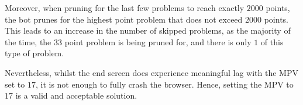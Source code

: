 \documentclass{article}
\begin{document}
Moreover, when pruning for the last few problems to reach exactly $2000$ points, the bot prunes for the highest point problem that does not exceed $2000$ points. This leads to an increase in the number of skipped problems, as the majority of the time, the $33$ point problem is being pruned for, and there is only $1$ of this type of problem. 

Nevertheless, whilst the end screen does experience meaningful lag with the MPV set to $17$, it is not enough to fully crash the browser. Hence, setting the MPV to $17$ is a valid and acceptable solution.

\newpage
\printbibliography
\end{document}
